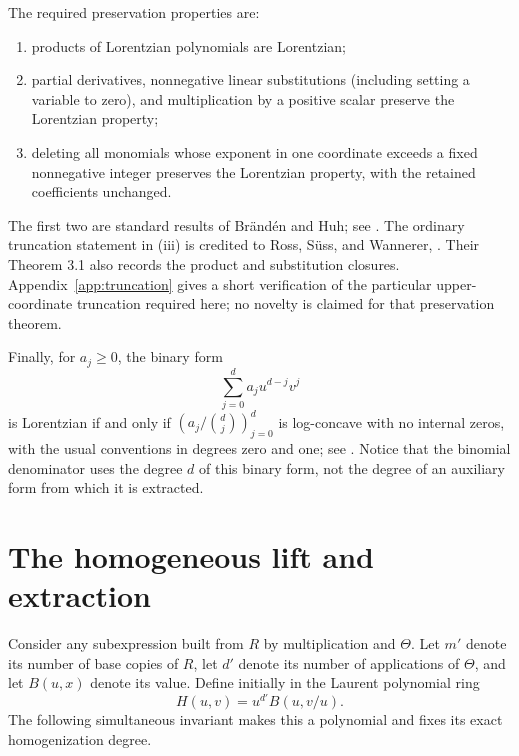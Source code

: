 \documentclass[11pt,letterpaper]{article}
\theoremstyle{definition}
\theoremstyle{remark}
\begin{document}
The required preservation properties are:
\begin{enumerate}[label=(\roman*)]
 \item products of Lorentzian polynomials are Lorentzian;
 \item partial derivatives, nonnegative linear substitutions (including setting a variable to zero), and multiplication by a positive scalar preserve the Lorentzian property;
 \item deleting all monomials whose exponent in one coordinate exceeds a fixed nonnegative integer preserves the Lorentzian property, with the retained coefficients unchanged.
\end{enumerate}
The first two are standard results of Br\"and\'en and Huh; see \cite[Theorem 2.10 and Corollary 2.32]{BH2020}. The ordinary truncation statement in (iii) is credited to Ross, S\"uss, and Wannerer, \cite[Definition 3.2 and Proposition 3.3]{RSW2025}. Their Theorem 3.1 also records the product and substitution closures. Appendix~\ref{app:truncation} gives a short verification of the particular upper-coordinate truncation required here; no novelty is claimed for that preservation theorem.

Finally, for $a_j\geq0$, the binary form
\begin{equation}\label{eq:binary}
 \sum_{j=0}^d a_j u^{d-j}v^j
\end{equation}
is Lorentzian if and only if $(a_j/\binom dj)_{j=0}^d$ is log-concave with no internal zeros, with the usual conventions in degrees zero and one; see \cite[Example 2.26]{BH2020}. Notice that the binomial denominator uses the degree $d$ of this binary form, not the degree of an auxiliary form from which it is extracted.

\section{The homogeneous lift and extraction}
Consider any subexpression built from $R$ by multiplication and $\Theta$. Let $m'$ denote its number of base copies of $R$, let $d'$ denote its number of applications of $\Theta$, and let $B(u,x)$ denote its value. Define initially in the Laurent polynomial ring
\begin{equation}\label{eq:lift}
 H(u,v)=u^{d'}B(u,v/u).
\end{equation}
The following simultaneous invariant makes this a polynomial and fixes its exact homogenization degree.
\end{document}
